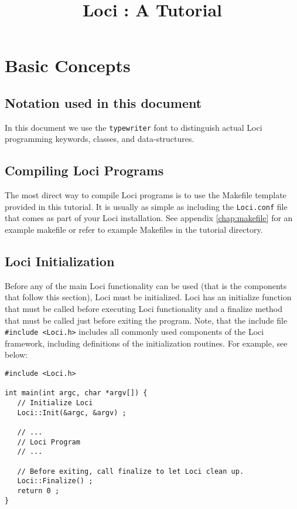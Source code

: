 \documentclass[10pt,epsf]{book}
\title { Loci : A Tutorial }
\begin{document}
\tableofcontents
\maketitle
\thispagestyle{empty}
\newpage
\setcounter{page}{1}



\chapter{ Basic Concepts }

\section{Notation used in this document}
In this document we use the {\tt typewriter} font to distinguish
actual Loci programming keywords, classes, and data-structures.

\section{ Compiling Loci Programs }

The most direct way to compile Loci programs is to use the Makefile
template provided in this tutorial.  It is usually as simple as
including the {\tt Loci.conf} file that comes as part of your Loci
installation.  See appendix \ref{chap:makefile} for an example
makefile or refer to example Makefiles in the tutorial directory.


\section{Loci Initialization}

Before any of the main Loci functionality can be used (that is the
components that follow this section), Loci must be initialized.  Loci
has an initialize function that must be called before executing Loci
functionality and a finalize method that must be called just before
exiting the program.  Note, that the include file {\tt \#include
  <Loci.h>} includes all commonly used components of the Loci
framework, including definitions of the initialization routines.  For
example, see below:
\clearpage
\begin{verbatim}
#include <Loci.h>

int main(int argc, char *argv[]) {
   // Initialize Loci
   Loci::Init(&argc, &argv) ;

   // ...
   // Loci Program
   // ...

   // Before exiting, call finalize to let Loci clean up.
   Loci::Finalize() ;
   return 0 ;
}
\end{verbatim}
\end{document}
